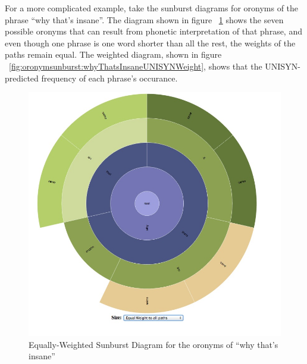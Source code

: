For a more complicated example, take the sunburst diagrams for oronyms of the phrase ``why that's insane''. The diagram shown in figure ~\ref{fig:oronymsunburst:whyThatsInsaneEqualWeight} shows the seven possible oronyms that can result from phonetic interpretation of that phrase, and even though one phrase is one word shorter than all the rest, the weights of the paths remain equal. The weighted diagram, shown in figure ~\ref{fig:oronymsunburst:whyThatsInsaneUNISYNWeight}, shows that the UNISYN-predicted frequency of each phrase's occurance. 


\begin{figure}
\includegraphics[width=150mm]{whyThatsInsane_EqualWeight.jpg}
\captionfonts
\caption[Equally-Weighted Sunburst Diagram for the oronyms of ``why that's insane'']{Equally-Weighted Sunburst Diagram for the oronyms of ``why that's insane''}
\label{fig:oronymsunburst:whyThatsInsaneEqualWeight}
\end{figure}


